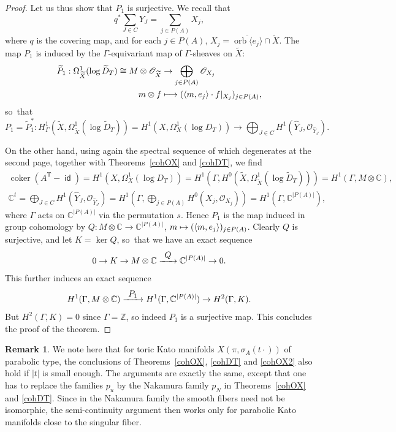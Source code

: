 \documentclass[JEP,XML,SOM,Unicode,NoFloatCountersInSection]{cedram}
\let\mathcal\mathscr
\theoremstyle{definition}
\newtheorem{remark}[theorem]{Remark}
\let\wt\widetilde
\newcommand\mto{\mathchoice{\longmapsto}{\mapsto}{\mapsto}{\mapsto}}
\newcommand{\To}[1]{\mathchoice{\xrightarrow{\textstyle\kern4pt#1\kern3pt}}{\stackrel{#1}{\longrightarrow}}{}{}}
\let\ov\overline
\newcommand{\CC}{\mathbb{C}}
\newcommand{\ZZ}{\mathbb{Z}}
\newcommand{\Oo}{\mathcal{O}}
\DeclareMathOperator{\coker}{coker}
\DeclareMathOperator{\id}{\mathsf{id}}
\DeclareMathOperator{\orb}{orb}
\newcommand{\transp}[1]{{#1}^{\scriptscriptstyle\mathrm{T}}}
\begin{document}
\begin{proof}
Let us thus show that $P_1$ is surjective. We recall that
\begin{equation*}
q^*\sum_{J\in C}Y_J=\sum_{j\in P(A)}X_j,
\end{equation*}
where $q$ is the covering map, and for each $j\in P(A)$, $X_j=\ov{\orb\langle e_j\rangle}\cap \wt{X}$. The map $P_1$ is induced by the $\Gamma$-equivariant map of $\Gamma$-sheaves on $\wt{X}$:
\begin{align*}
\wt{P}_1:\Omega^1_{\wt{X}}(\log \wt{D}_T)\cong M\otimes\Oo_{\wt{X}}&\to \bigoplus_{j\in P(A)}\Oo_{X_j}\\
m\otimes f&\mto (\langle m,e_j\rangle\cdot f|_{X_j})_{j\in P(A)},
\end{align*}
so~that
\begin{equation*}
P_1=\wt{P}_1^*:H^1_\Gamma(\wt{X},\Omega^1_{\wt{X}}(\log \wt{D}_T))=H^1(X,\Omega^1_X(\log D_T))\to \bigoplus_{J\in C}H^1(\hat Y_J,\Oo_{\hat Y_J}).
\end{equation*}

On the other hand, using again the spectral sequence of \cite{gr} which degenerates at the second page, together with Theorems~\ref{cohOX} and \ref{cohDT}, we find
\begin{gather*}
\coker(\transp{A}-\id)\!=\!H^1(X,\Omega^1_X(\log D_T))\!=\!H^1(\Gamma, H^0(\wt{X},\Omega^1_{\wt{X}}(\log \wt{D}_T)))\!=\!H^1(\Gamma,M\otimes\CC),\\\textstyle
\CC^t=\bigoplus_{J\in C}H^1(\hat Y_J,\Oo_{\hat Y_J})=H^1(\Gamma, \bigoplus_{j\in P(A)}H^0(X_j,\Oo_{X_j}))=H^1(\Gamma, \CC^{|P(A)|}),
\end{gather*}
where $\Gamma$ acts on $\CC^{|P(A)|}$ via the permutation $s$.
Hence $P_1$ is the map induced in group cohomology by $Q:M\otimes\CC\to \CC^{|P(A)|}$, $m\mto (\langle m, e_j\rangle)_{j\in P(A)}$. Clearly $Q$ is surjective, and let $K=\ker Q$, so~that we have an exact sequence
\begin{equation*}
0\to K\to M\otimes\CC\To Q \CC^{|P(A)|}\to 0.
\end{equation*}
This further induces an exact sequence
\begin{equation*}
H^1(\Gamma, M\otimes \CC)\To{P_1} H^1(\Gamma, \CC^{|P(A)|})\to  H^2(\Gamma, K).
\end{equation*}
But $H^2(\Gamma, K)=0$ since $\Gamma=\ZZ$, so indeed $P_1$ is a surjective map. This concludes the proof of the theorem.
\end{proof}

\begin{remark}\label{invParabolic}
We note here that for toric Kato manifolds $X(\pi,\sigma_A(t\cdot))$ of parabolic type, the conclusions of Theorems~\ref{cohOX}, \ref{cohDT} and \ref{cohOX2} also hold if $|t|$ is small enough. The arguments are exactly the same, except that one has to replace the families $p_u$ by the Nakamura family $p_N$ in Theorems~\ref{cohOX} and \ref{cohDT}. Since in the Nakamura family the smooth fibers need not be isomorphic, the semi-continuity argument then works only for parabolic Kato manifolds close to the singular fiber.
\end{remark}
\end{document}
